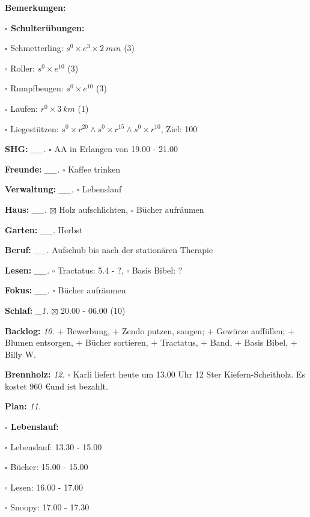 \documentclass[10pt,a4paper]{article}
\newcommand\prop[1] {{\color {alizarin} {\bf #1}}}        %
\newcommand\draf[1] {{\color {amber(sae/ece)} {\bf #1}}}  %
\newcommand\opti[1] {{\color {amethyst} {\bf #1}}}        %
\newcommand\mand[1] {{\color {burntorange} {\bf #1}}}     %
\newcommand\topspace{\vskip -15pt \hskip 20pt}
\newcommand\bottomspace{\vskip 4pt}
\newcommand\n[1] { {\sl #1.} \hskip 5pt }
\begin{document}
\begin{mdframed}[style=daystyle]
\begin{labeling}{{\mand {Bemerkungen:}}}
\begin{minipage}{0.75\textwidth}
\begin{labeling}{\prop {$\square$ {Schulterübungen:}}}
      \item[$\square$ Schmetterling:]   $s^0 \times e^3 \times 2\ min$ (3)
      \item[$\square$ Roller:]          $s^0 \times e^{10}$ (3)
      \item[$\square$ Rumpfbeugen:]     $s^0 \times e^{10}$ (3)
      \item[$\square$ Laufen:]          $r^0 \times 3\ km$ (1)
      \item[$\square$ Liegestützen:]    $s^0 \times r^{20} \land s^0 \times r^{15} \land s^0 \times r^{10}$, Ziel: 100
      \end{labeling}
    \end{minipage}
    \bottomspace        
  \item[{\mand {SHG:}}]          \n{\_\_} $\square$ AA in Erlangen von 19.00 - 21.00
  \item[{\mand {Freunde:}}]      \n{\_\_} $\square$ Kaffee trinken
  \item[{\mand {Verwaltung:}}]   \n{\_\_} $\square$ Lebenslauf
  \item[{\mand {Haus:}}]         \n{\_\_} $\boxtimes$ Holz aufschlichten, $\square$ Bücher aufräumen
  \item[{\mand {Garten:}}]       \n{\_\_} Herbst
  \item[{\mand {Beruf:}}]        \n{\_\_} Aufschub bis nach der stationären Therapie
  \item[{\mand {Lesen:}}]        \n{\_\_} $\square$ Tractatus: 5.4 - ?, $\square$ Basis Bibel: ?
  \item[{\mand {Fokus:}}]        \n{\_\_} $\square$ Bücher aufräumen
  \item[{\mand {Schlaf:}}]        \n{\_1} $\boxtimes$ 20.00 - 06.00 (10)
  \item[{\mand {Backlog:}}]        \n{10} 
    $+$ Bewerbung,
    $+$ Zendo putzen, saugen; $+$ Gewürze auffüllen; $+$ Blumen entsorgen, $+$ Bücher sortieren,
    $+$ Tractatus, $+$ Band, $+$ Basis Bibel, $+$ Billy W.
  \item[{\opti {Brennholz:}}]      \n{12} $\square$ Karli liefert heute um 13.00 Uhr 12 Ster Kiefern-Scheitholz.
    Es kostet 960 \euro und ist bezahlt.
  \item[{\mand {Plan:}}]           \n{11}
    \topspace
    \begin{minipage}{0.75\textwidth}  
      \begin{labeling}{\draf {$\square$ {Lebenslauf:}}} 
        \setlength\itemsep{-3pt}
      \item[$\square$ Lebenslauf:] 13.30 - 15.00
      \item[$\square$ Bücher:]     15.00 - 15.00
      \item[$\square$ Lesen:]      16.00 - 17.00
      \item[$\square$ Snoopy:]     17.00 - 17.30
        

\end{labeling}
\end{minipage}
\end{labeling}
\end{mdframed}
\end{document}
